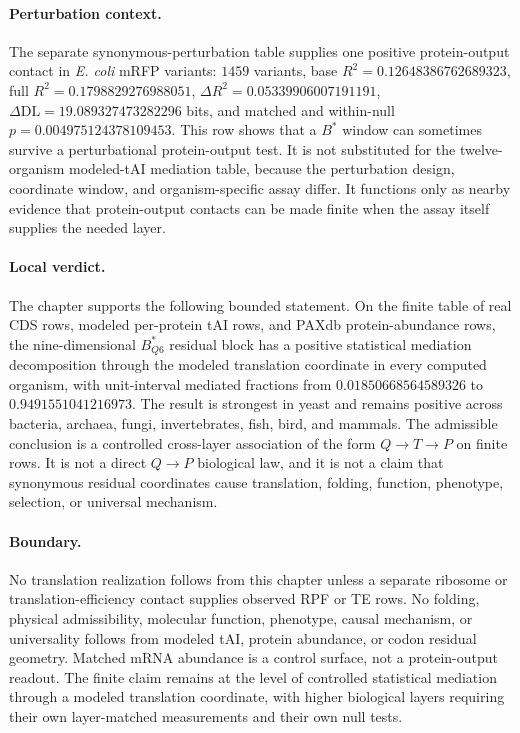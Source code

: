 \paragraph{Perturbation context.}
The separate synonymous-perturbation table supplies one positive protein-output contact in \emph{E. coli} mRFP variants: $1459$ variants, base $R^2=0.12648386762689323$, full $R^2=0.1798829276988051$, $\Delta R^2=0.05339906007191191$, $\Delta\mathrm{DL}=19.089327473282296$ bits, and matched and within-null $p=0.004975124378109453$.  This row shows that a $B^{\ast}$ window can sometimes survive a perturbational protein-output test.  It is not substituted for the twelve-organism modeled-tAI mediation table, because the perturbation design, coordinate window, and organism-specific assay differ.  It functions only as nearby evidence that protein-output contacts can be made finite when the assay itself supplies the needed layer.

\paragraph{Local verdict.}
The chapter supports the following bounded statement.  On the finite table of real CDS rows, modeled per-protein tAI rows, and PAXdb protein-abundance rows, the nine-dimensional $B^{\ast}_{Q6}$ residual block has a positive statistical mediation decomposition through the modeled translation coordinate in every computed organism, with unit-interval mediated fractions from $0.01850668564589326$ to $0.9491551041216973$.  The result is strongest in yeast and remains positive across bacteria, archaea, fungi, invertebrates, fish, bird, and mammals.  The admissible conclusion is a controlled cross-layer association of the form $Q \to T \to P$ on finite rows.  It is not a direct $Q \to P$ biological law, and it is not a claim that synonymous residual coordinates cause translation, folding, function, phenotype, selection, or universal mechanism.

\paragraph{Boundary.}
No translation realization follows from this chapter unless a separate ribosome or translation-efficiency contact supplies observed RPF or TE rows.  No folding, physical admissibility, molecular function, phenotype, causal mechanism, or universality follows from modeled tAI, protein abundance, or codon residual geometry.  Matched mRNA abundance is a control surface, not a protein-output readout.  The finite claim remains at the level of controlled statistical mediation through a modeled translation coordinate, with higher biological layers requiring their own layer-matched measurements and their own null tests.
